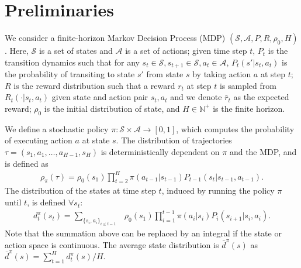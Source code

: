 \documentclass{article}
\begin{document}
\section{Preliminaries}
We consider a finite-horizon Markov Decision Process (MDP) $(\mathcal{S}, \mathcal{A}, P, R, \rho_0, H)$. Here,  $\mathcal{S}$ is a set of states and $\mathcal{A}$ is a set of actions; given time step $t$, $P_t$ is the transition dynamics such that for any $s_t\in\mathcal{S},s_{t+1}\in\mathcal{S}, a_t\in\mathcal{A}$, $P_t(s'|s_t, a_t)$ is the probability of transiting to state $s'$ from state $s$ by taking action $a$ at step $t$; $R$ is the reward distribution such that a reward $r_t$ at step $t$ is sampled from $R_t(\cdot | s_t, a_t)$ given state and action pair $s_t,a_t$ and we denote $\bar{r}_t$ as the expected reward; $\rho_0$ is the initial distribution of state, and $H\in\mathbb{N}^+$ is the finite horizon. 

We define a stochastic policy $\pi: \mathcal{S}\times\mathcal{A}\to [0,1]$, which computes the probability of executing action $a$ at state $s$. The distribution of trajectories $\tau = (s_1, a_1, \hdots,a_{H-1}, s_H)$ is deterministically dependent on $\pi$ and the MDP, and is defined as
\begin{align}
\rho_{\pi}(\tau) = \rho_0(s_1) \prod_{t=2}^{H} \pi(a_{t-1}|s_{t-1})P_{t-1}(s_t|s_{t-1}, a_{t-1}).\nonumber
\end{align}
%
%
The distribution of the states at time step $t$, induced by running the policy $\pi$ until $t$, is defined  $\forall s_t$:
\begin{align}
d_t^{\pi}(s_{t}) = \sum_{\{s_i,a_i\}_{i\leq t-1}} &\rho_{0}(s_1)\prod_{i=1}^{t-1}\pi(a_i|s_i)P_{i}(s_{i+1}|s_{i},a_{i}). \nonumber
\end{align} Note that the summation above can be replaced by an integral if the state or action space is continuous. The average state distribution is $\bar{d}^{\pi}(s)$ as $\bar{d}^{\pi}(s) = \sum_{t=1}^H d_t^{\pi}(s) / H$.


\end{document}
